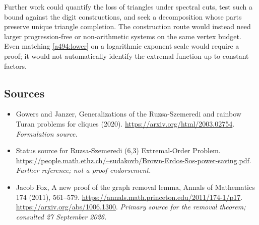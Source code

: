 \documentclass[11pt]{article}
\begin{document}
Further work could quantify the loss of triangles under spectral cuts,
test such a bound against the digit constructions, and seek a decomposition
whose parts preserve unique triangle completion. The construction route
would instead need larger progression-free or non-arithmetic systems on
the same vertex budget. Even matching \eqref{a494:lower} on a logarithmic
exponent scale would require a proof; it would not automatically identify
the extremal function up to constant factors.

\subsection{Sources}
\begin{itemize}
\item[S1]Gowers and Janzer, Generalizations of the Ruzsa-Szemeredi and rainbow Turan problems for cliques (2020).
\url{https://arxiv.org/html/2003.02754}.
\textit{Formulation source.}
\item[S2]Status source for Ruzsa-Szemeredi (6,3) Extremal-Order Problem.
\url{https://people.math.ethz.ch/~sudakovb/Brown-Erdos-Sos-power-saving.pdf}.
\textit{Further reference; not a proof endorsement.}
\item[E1]Jacob Fox, A new proof of the graph removal lemma,
Annals of Mathematics 174 (2011), 561--579.
\url{https://annals.math.princeton.edu/2011/174-1/p17}.
\url{https://arxiv.org/abs/1006.1300}.
\textit{Primary source for the removal theorem; consulted 27 September 2026.}

\end{itemize}
\end{document}
